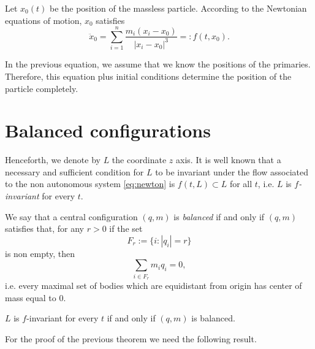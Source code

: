 \documentclass[smallcondensed]{svjour3}
\begin{document}
Let $x_0(t)$ be the position of the massless particle.
According to the Newtonian equations of motion, $x_0$ satisfies
\begin{equation}\label{eq:newton}
 \ddot{x}_0=\sum_{i=1}^n\frac{m_i(x_i-x_0)}{|x_i-x_0|^3}=:f(t,x_0).
\end{equation}

In the previous equation, we assume that we know the positions of the primaries. Therefore, this equation plus  initial conditions  determine the position of the particle completely.



\section{Balanced configurations}\label{sec:admisible.configuraciones}
Henceforth, we denote by $L$ the coordinate $z$ axis.
It is well known that a  necessary and sufficient condition for $L$ to be invariant under the  flow associated to the non autonomous system  \eqref{eq:newton} is  $f(t,L)\subset L$ for all $t$, i.e. $L$ is \emph{$f$-invariant} for every $t$.


\begin{definition}
We say that a
central configuration $(q,m)$ is \emph{balanced} if and only if $(q,m)$ satisfies that, for any $r>0$ if the set
\[F_r:=\{i:|q_i|=r\}\]
is non empty, then
\begin{equation}\label{eq:suma0}\sum_{i\in F_r}m_iq_i=0,\end{equation}
i.e. every maximal set of  bodies which are equidistant from origin has center of mass equal to $0$.
\end{definition}



\begin{theorem}\label{thm:prim} $L$ is $f$-invariant for every $t$ if and only if $(q,m)$ is balanced.
\end{theorem}

For the proof of the previous theorem we need the following result.
\end{document}
